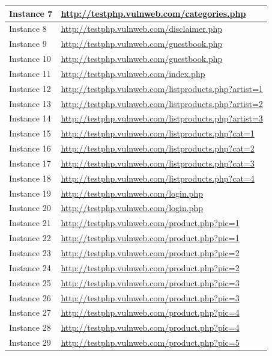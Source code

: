 \documentclass[12pt]{article}
\begin{document}
\begin{center}
\begin{longtable}{|l|p{10cm}|}
\hline
Instance 7 & \url{http://testphp.vulnweb.com/categories.php} \\
\hline
Instance 8 & \url{http://testphp.vulnweb.com/disclaimer.php} \\
\hline
Instance 9 & \url{http://testphp.vulnweb.com/guestbook.php} \\
\hline
Instance 10 & \url{http://testphp.vulnweb.com/guestbook.php} \\
\hline
Instance 11 & \url{http://testphp.vulnweb.com/index.php} \\
\hline
Instance 12 & \url{http://testphp.vulnweb.com/listproducts.php?artist=1} \\
\hline
Instance 13 & \url{http://testphp.vulnweb.com/listproducts.php?artist=2} \\
\hline
Instance 14 & \url{http://testphp.vulnweb.com/listproducts.php?artist=3} \\
\hline
Instance 15 & \url{http://testphp.vulnweb.com/listproducts.php?cat=1} \\
\hline
Instance 16 & \url{http://testphp.vulnweb.com/listproducts.php?cat=2} \\
\hline
Instance 17 & \url{http://testphp.vulnweb.com/listproducts.php?cat=3} \\
\hline
Instance 18 & \url{http://testphp.vulnweb.com/listproducts.php?cat=4} \\
\hline
Instance 19 & \url{http://testphp.vulnweb.com/login.php} \\
\hline
Instance 20 & \url{http://testphp.vulnweb.com/login.php} \\
\hline
Instance 21 & \url{http://testphp.vulnweb.com/product.php?pic=1} \\
\hline
Instance 22 & \url{http://testphp.vulnweb.com/product.php?pic=1} \\
\hline
Instance 23 & \url{http://testphp.vulnweb.com/product.php?pic=2} \\
\hline
Instance 24 & \url{http://testphp.vulnweb.com/product.php?pic=2} \\
\hline
Instance 25 & \url{http://testphp.vulnweb.com/product.php?pic=3} \\
\hline
Instance 26 & \url{http://testphp.vulnweb.com/product.php?pic=3} \\
\hline
Instance 27 & \url{http://testphp.vulnweb.com/product.php?pic=4} \\
\hline
Instance 28 & \url{http://testphp.vulnweb.com/product.php?pic=4} \\
\hline
Instance 29 & \url{http://testphp.vulnweb.com/product.php?pic=5} \\

\end{longtable}
\end{center}
\end{document}

